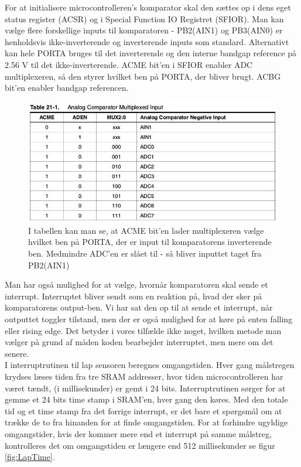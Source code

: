 For at initialisere microcontrolleren's komparator skal den sættes op i dens eget status register (ACSR) og i Special Function IO Registret (SFIOR). Man kan vælge flere forskellige inputs til komparatoren - PB2(AIN1) og PB3(AIN0) er henholdsvis ikke-inverterende og inverterende inputs som standard. Alternativt kan hele PORTA bruges til det inverterende og den interne bandgap reference på 2.56 V til det ikke-inverterende.  ACME bit'en i SFIOR enabler ADC multiplexeren, så den styrer hvilket ben på PORTA, der bliver brugt. ACBG bit'en enabler bandgap referencen.

\begin{figure}[h]

	\centering
		\includegraphics[scale=0.3]{Billeder/Table21-1.jpg}
	\caption{I tabellen kan man se, at ACME bit'en lader multiplexeren vælge hvilket ben på PORTA, der er input til komparatorens inverterende ben. Medmindre ADC'en er slået til - så bliver inputtet taget fra PB2(AIN1)}
	\label{fig:ACME}
	
\end{figure}

Man har også mulighed for at vælge, hvornår komparatoren skal sende et interrupt. Interruptet bliver sendt som en reaktion på, hvad der sker på komparatorens output-ben. Vi har sat den op til at sende et interrupt, når outputtet toggler tilstand, men der er også mulighed for at køre på enten falling eller rising edge. Det betyder i vores tilfælde ikke noget, hvilken metode man vælger på grund af måden koden bearbejder interruptet, men mere om det senere.\\

I interruptrutinen til lap sensoren beregnes omgangstiden. Hver gang målstregen krydses læses tiden fra tre SRAM addresser, hvor tiden microcontrolleren har været tændt, (i millisekunder) er gemt i 24 bits. Interruptrutinen sørger for at gemme et 24 bits time stamp i SRAM'en, hver gang den køres. Med den totale tid og et time stamp fra det forrige interrupt, er det bare et spørgsmål om at trække de to fra hinanden for at finde omgangstiden. For at forhindre ugyldige omgangstider, hvis der kommer mere end et interrupt på samme målstreg, kontrolleres det om omgangstiden er længere end 512 millisekunder se figur \ref{fig:LapTime}.

